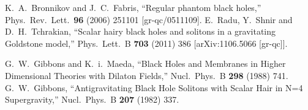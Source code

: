 \documentclass{article}
\numberwithin{equation}{section}
\begin{document}
\begin{small}
\begin{thebibliography}{99}
  K.~A.~Bronnikov and J.~C.~Fabris,
  ``Regular phantom black holes,''
  Phys.\ Rev.\ Lett.\  {\bf 96} (2006) 251101
  [gr-qc/0511109].
  E.~Radu, Y.~Shnir and D.~H.~Tchrakian,
  ``Scalar hairy black holes and solitons in a gravitating Goldstone model,''
  Phys.\ Lett.\ B {\bf 703} (2011) 386
  [arXiv:1106.5066 [gr-qc]].
	
  G.~W.~Gibbons and K.~i.~Maeda,
  ``Black Holes and Membranes in Higher Dimensional Theories with Dilaton Fields,''
  Nucl.\ Phys.\ B {\bf 298} (1988) 741.
  G.~W.~Gibbons,
  ``Antigravitating Black Hole Solitons with Scalar Hair in N=4 Supergravity,''
  Nucl.\ Phys.\ B {\bf 207} (1982) 337.


\end{thebibliography}
\end{small}
\end{document}
